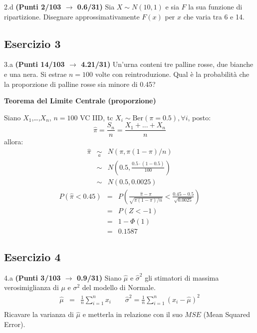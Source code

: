 \documentclass[
  11pt,
]{book}
\theoremstyle{mytheoremstyle}
\theoremstyle{mydefstyle}
\newenvironment{sol}
  {
  \begin{tcolorbox}[enhanced,breakable,arc=0.1mm,boxrule=1pt,colback=white,colframe=iblue,
  title=\bf \fontfamily{lmss}\selectfont \hspace{.5 cm} Soluzione,drop fuzzy shadow]

}{
\end{tcolorbox}
  }
\begin{document}
2.d \textbf{(Punti 2/103 \(\rightarrow\) 0.6/31)} Sia \(X\sim N(10,1)\) e sia \(F\) la sua funzione di ripartizione. Disegnare approssimativamente \(F(x)\) per \(x\) che varia tra 6 e 14.

\subsection{Esercizio 3}\label{esercizio-3-23}

3.a \textbf{(Punti 14/103 \(\rightarrow\) 4.21/31)} Un'urna conteni tre palline rosse, due bianche e una nera. Si estrae \(n=100\) volte con reintroduzione. Qual è la probabilità che la proporzione di palline rosse sia minore di 0.45?

\begin{sol}
\textbf{Teorema del Limite Centrale (proporzione)}

Siano \(X_1\),\ldots,\(X_n\), \(n=100\) VC IID, tc \(X_i\sim\text{Ber}(\pi=0.5)\)\(,\forall i\), posto:
\[
      \hat\pi=\frac{S_n}n = \frac{X_1 + ... + X_n}n
      \]
allora:\begin{eqnarray*}
  \hat\pi & \mathop{\sim}\limits_{a}& N(\pi,\pi(1-\pi)/n) \\
  &\sim & N\left(0.5,\frac{0.5\cdot(1-0.5)}{100}\right) \\
     &\sim & N(0.5,0.0025) 
  \end{eqnarray*}\begin{eqnarray*}
      P( \hat\pi   <   0.45 ) 
        &=& P\left(  \frac { \hat\pi  -  \pi }{ \sqrt{\pi(1-\pi)/n} }  <  \frac { 0.45  -  0.5 }{\sqrt{ 0.0025 }} \right)  \\
                 &=& P\left(  Z   <   -1 \right) \\    
                 &=&  1-\Phi( 1 ) \\ &=&  0.1587 
      \end{eqnarray*}

\end{sol}

\subsection{Esercizio 4}\label{esercizio-4-23}

4.a \textbf{(Punti 3/103 \(\rightarrow\) 0.9/31)} Siano \(\hat \mu\) e \(\hat\sigma^2\) gli stimatori di massima verosimiglianza di \(\mu\) e \(\sigma^2\) del modello di Normale.
\begin{eqnarray*}
  \hat\mu &=&  \frac 1n\sum_{i=1}^nx_i \qquad \hat\sigma^2 =  \frac 1n\sum_{i=1}^n(x_i-\hat\mu)^2\\
\end{eqnarray*}
Ricavare la varianza di \(\hat\mu\) e metterla in relazione con il suo \(MSE\) (Mean Squared Error).
\end{document}
